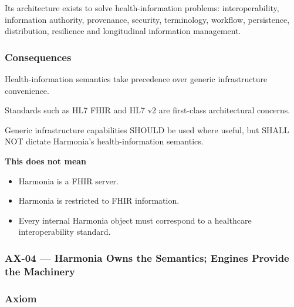 Its architecture exists to solve health-information problems: interoperability, information authority, provenance, security, terminology, workflow, persistence, distribution, resilience and longitudinal information management.

\label{rad:axioms:99}
\subsubsection*{Consequences}
\label{rad:axioms:101}

Health-information semantics take precedence over generic infrastructure convenience.

\label{rad:axioms:104}

Standards such as HL7 FHIR and HL7 v2 are first-class architectural concerns.

\label{rad:axioms:107}

Generic infrastructure capabilities SHOULD be used where useful, but SHALL NOT dictate Harmonia's health-information semantics.

\label{rad:axioms:110}

\textbf{This does not mean}

\label{rad:axioms:112}

\begin{itemize}

\item 
Harmonia is a FHIR server.



\item 
Harmonia is restricted to FHIR information.



\item 
Every internal Harmonia object must correspond to a healthcare interoperability standard.



\end{itemize}
\label{rad:axioms:116}



\label{rad:axioms:204}
\subsubsection*{AX-04 --- Harmonia Owns the Semantics; Engines Provide the Machinery}
\label{rad:axioms:206}
\subsubsection*{Axiom}
\label{rad:axioms:208}

